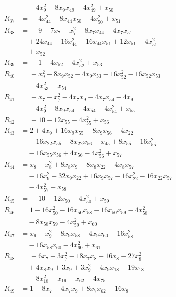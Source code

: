 \begin{align*}
&\quad{} -4x_{9}^{2} -8x_{9}x_{49} -4x_{49}^{2} +x_{50} \\
R_{37} &={} -4x_{44}^{2} -8x_{44}x_{50} -4x_{50}^{2} +x_{51} \\
R_{38} &={} -9 +7x_{7} -x_{7}^{2} -8x_{7}x_{44} -4x_{7}x_{51} \\
&\quad{} +24x_{44} -16x_{44}^{2} -16x_{44}x_{51} +12x_{51} -4x_{51}^{2} \\
&\quad{} +x_{52} \\
R_{39} &={} -1 -4x_{52} -4x_{52}^{2} +x_{53} \\
R_{40} &={} -x_{9}^{2} -8x_{9}x_{52} -4x_{9}x_{53} -16x_{52}^{2} -16x_{52}x_{53} \\
&\quad{} -4x_{53}^{2} +x_{54} \\
R_{41} &={} -x_{7} -x_{7}^{2} -4x_{7}x_{9} -4x_{7}x_{54} -4x_{9} \\
&\quad{} -4x_{9}^{2} -8x_{9}x_{54} -4x_{54} -4x_{54}^{2} +x_{55} \\
R_{42} &={} -10 -12x_{55} -4x_{55}^{2} +x_{56} \\
R_{43} &={} 2 +4x_{9} +16x_{9}x_{55} +8x_{9}x_{56} -4x_{22} \\
&\quad{} -16x_{22}x_{55} -8x_{22}x_{56} -x_{45} +8x_{55} -16x_{55}^{2} \\
&\quad{} -16x_{55}x_{56} +4x_{56} -4x_{56}^{2} +x_{57} \\
R_{44} &={} x_{8} -x_{8}^{2} +8x_{8}x_{9} -8x_{8}x_{22} -4x_{8}x_{57} \\
&\quad{} -16x_{9}^{2} +32x_{9}x_{22} +16x_{9}x_{57} -16x_{22}^{2} -16x_{22}x_{57} \\
&\quad{} -4x_{57}^{2} +x_{58} \\
R_{45} &={} -10 -12x_{50} -4x_{50}^{2} +x_{59} \\
R_{46} &={} 1 -16x_{50}^{2} -16x_{50}x_{58} -16x_{50}x_{59} -4x_{58}^{2} \\
&\quad{} -8x_{58}x_{59} -4x_{59}^{2} +x_{60} \\
R_{47} &={} x_{9} -x_{9}^{2} -8x_{9}x_{58} -4x_{9}x_{60} -16x_{58}^{2} \\
&\quad{} -16x_{58}x_{60} -4x_{60}^{2} +x_{61} \\
R_{48} &={} -6x_{7} -3x_{7}^{2} -18x_{7}x_{8} -16x_{8} -27x_{8}^{2} \\
&\quad{} +4x_{8}x_{9} +3x_{9} +3x_{9}^{2} -4x_{9}x_{18} -19x_{18} \\
&\quad{} -8x_{18}^{2} +x_{19} +x_{62} -4x_{75} \\
R_{49} &={} 1 -8x_{7} -4x_{7}x_{9} +8x_{7}x_{62} -16x_{8} \\

\end{align*}
